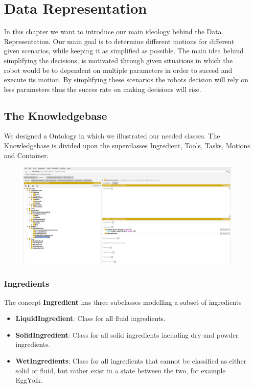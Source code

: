 \chapter{Data Representation}
\label{chap:Data_representation}

In this chapter we want to introduce our main ideology behind the Data Representation. Our main goal is to determine different motions for different given scenarios, while keeping it as simplified as possible.
The main idea behind simplifying the decisions, is motivated through given situations in which the robot would be to dependent on multiple parameters in order to suceed and execute its motion.
By simplifying these scenarios the robots decision will rely on less parameters thus the succes rate on making decisions will rise.

\section*{The Knowledgebase}
We designed a Ontology in which we illustrated our needed classes. 
The Knowledgebase is divided upon the superclasses Ingredient, Tools, Tasks, Motions and Container.
\begin{figure}[H]
\includegraphics[scale=0.3]{Graphics/Ontology.png}
\end{figure}

\subsection*{Ingredients}
The concept \textbf{Ingredient} has three subclasses modelling a subset of ingredients
\begin{itemize}
    \item \textbf{LiquidIngredient}: Class for all fluid ingredients.
    \item \textbf{SolidIngredient}: Class for all solid ingredients including dry and powder ingredients. 
    \item \textbf{WetIngredients}: Class for all ingredients that cannot be classified as either solid or fluid, but rather exist in a state between the two, for example
        EggYolk.
\end{itemize}


